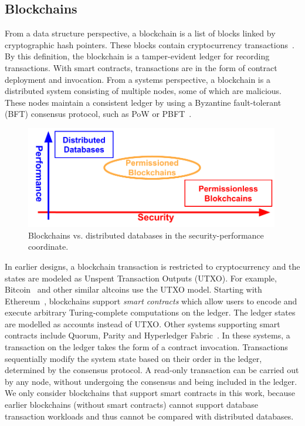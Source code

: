 \subsection{Blockchains}
From a data structure perspective, a blockchain is a list of blocks linked by
cryptographic hash pointers. These blocks contain cryptocurrency
transactions~\cite{nakamoto2019bitcoin}. By this definition, the blockchain is a
tamper-evident ledger for recording transactions. With smart contracts,
transactions are in the form of contract deployment and invocation.
From a systems perspective, a blockchain is a distributed system consisting of
multiple nodes, some of which are malicious. These nodes maintain a consistent
ledger by using a Byzantine fault-tolerant (BFT) consensus protocol, such as PoW
or PBFT~\cite{castro1999practical}.

\begin{figure}[tp]
  \centering
  \includegraphics[width=0.99\textwidth]{diagram/twin/spectrum.pdf}
  \caption{Blockchains vs. distributed databases in the security-performance coordinate.}
  \label{diagram:twin:spectrum}
 \end{figure}


In earlier designs, a blockchain transaction is restricted to cryptocurrency and
the states are modeled as Unspent Transaction Outputs (UTXO).  For example,
Bitcoin~\cite{nakamoto2019bitcoin} and other similar altcoins use the UTXO
model.  Starting with Ethereum~\cite{web:ethereum}, blockchains support
\textit{smart contracts} which allow users to encode and execute arbitrary
Turing-complete computations on the ledger. The ledger states are modelled as
accounts instead of UTXO.
Other systems supporting smart contracts include Quorum, Parity and Hyperledger
Fabric~\cite{androulaki2018hyperledger}.  In these systems, a transaction on the
ledger takes the form of a contract invocation.
Transactions sequentially modify the system state based on their order in the
ledger, determined by the consensus protocol. A read-only transaction can be
carried out by any node, without undergoing the consensus and being included in
the ledger. We only consider blockchains that support smart contracts in this
work, because earlier blockchains (without smart contracts) cannot support
database transaction workloads and thus cannot be compared with distributed
databases.

